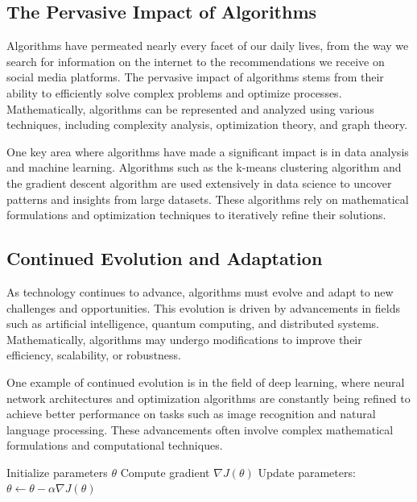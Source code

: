 \documentclass[12pt]{book} %
\begin{document}
\subsection{The Pervasive Impact of Algorithms}
Algorithms have permeated nearly every facet of our daily lives, from the way we search for information on the internet to the recommendations we receive on social media platforms. The pervasive impact of algorithms stems from their ability to efficiently solve complex problems and optimize processes. Mathematically, algorithms can be represented and analyzed using various techniques, including complexity analysis, optimization theory, and graph theory.

One key area where algorithms have made a significant impact is in data analysis and machine learning. Algorithms such as the k-means clustering algorithm and the gradient descent algorithm are used extensively in data science to uncover patterns and insights from large datasets. These algorithms rely on mathematical formulations and optimization techniques to iteratively refine their solutions.

\subsection{Continued Evolution and Adaptation}
As technology continues to advance, algorithms must evolve and adapt to new challenges and opportunities. This evolution is driven by advancements in fields such as artificial intelligence, quantum computing, and distributed systems. Mathematically, algorithms may undergo modifications to improve their efficiency, scalability, or robustness.

One example of continued evolution is in the field of deep learning, where neural network architectures and optimization algorithms are constantly being refined to achieve better performance on tasks such as image recognition and natural language processing. These advancements often involve complex mathematical formulations and computational techniques.

\FloatBarrier
\begin{algorithm}
\caption{Gradient Descent Algorithm}
\begin{algorithmic}[1]
\State Initialize parameters $\theta$
\Repeat
\State Compute gradient $\nabla J(\theta)$
\State Update parameters: $\theta \leftarrow \theta - \alpha \nabla J(\theta)$
\end{algorithmic}
\end{algorithm}
\FloatBarrier
\end{document}

